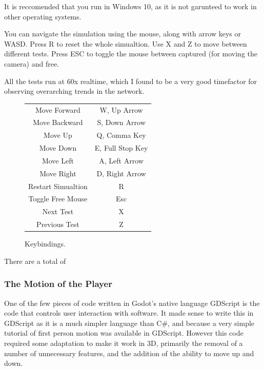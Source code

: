 \documentclass[12pt]{article}
\begin{document}
It is reccomended that you run in Windows 10, as it is not garunteed to work in other operating systems.

You can navigate the simulation using the mouse, along with arrow keys or WASD. Press R to reset the whole simualtion. Use X and Z to move between different tests. Press ESC to toggle the mouse between captured (for moving the camera) and free.

All the tests run at 60x realtime, which I found to be a very good timefactor for observing overarching trends in the network.

\begin{figure}
\begin{center}
\label{fig:Keybindings}
\caption{Keybindings.}
\begin{tabular}{ | c | c  | }
	\hline
	Move Forward & W, Up Arrow \\
	Move Backward & S, Down Arrow\\
	Move Up & Q, Comma Key\\
	Move Down & E, Full Stop Key\\
	Move Left & A, Left Arrow \\
	Move Right & D, Right Arrow \\
	Restart Simualtion & R \\
	Toggle Free Mouse & Esc \\
	Next Test & X\\
	Previous Test & Z\\
	\hline
\end{tabular}
\end{center}
\end{figure}

There are a total of %

\subsubsection{The Motion of the Player}

One of the few pieces of code written in Godot's native language GDScript is the code that controls user interaction with software. It made sense to write this in GDScript as it is a much simpler language than C\#, and because a very simple tutorial of first person motion was available in GDScript\cite{FirstPersonMotion}. However this code required some adaptation to make it work in 3D, primarily the removal of a number of unnecessary features, and the addition of the ability to move up and down.
\end{document}
